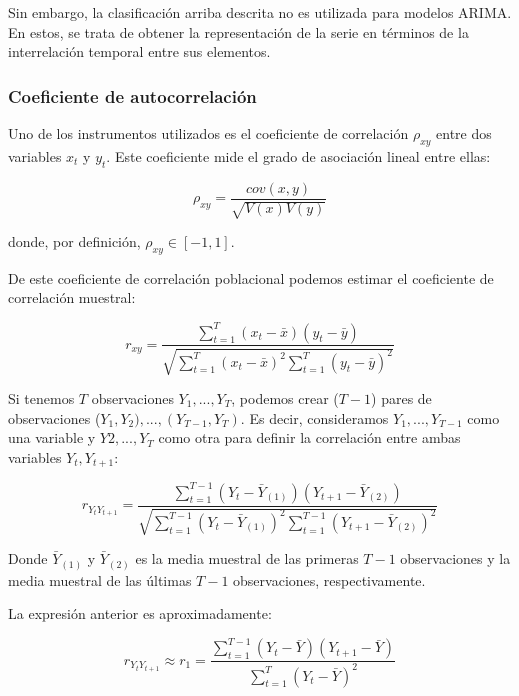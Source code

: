\documentclass[a4paper,10pt]{article}
\begin{document}
Sin embargo, la clasificación arriba descrita no es utilizada para modelos ARIMA. En estos, se trata de obtener la representación de la serie en términos de la interrelación temporal entre sus elementos.

\subsubsection{Coeficiente de autocorrelación}

Uno de los instrumentos utilizados es el coeficiente de correlación $\rho_{xy}$ entre dos variables $x_t$ y $y_t$. Este coeficiente mide el grado de asociación lineal entre ellas:

\begin{equation}
 \rho_{xy} = \frac{cov(x,y)}{\sqrt{V(x)V(y)}}
\end{equation}

donde, por definición, $\rho_{xy} \in [-1,1]$.

De este coeficiente de correlación poblacional podemos estimar el coeficiente de correlación muestral:

\begin{equation}
 r_{xy} = \frac{\sum_{t=1}^{T} (x_t - \bar{x}) (y_t - \bar{y})}
 {\sqrt{\sum_{t=1}^{T} (x_t - \bar{x})^2 \sum_{t=1}^{T} (y_t - \bar{y})^2 } }
\end{equation}

Si tenemos $T$ observaciones $Y_1,..., Y_T$, podemos crear ($T-1$) pares de observaciones ($Y_1,Y_2),...,(Y_{T-1},Y_T)$. Es decir, consideramos $Y_1,...,Y_{T-1}$ como una variable y $Y2,...,Y_T$ como otra para definir la correlación entre ambas variables $Y_t,Y_{t+1}$:

\begin{equation}
 r_{Y_t Y_{t+1}} = \frac{\sum_{t=1}^{T-1} (Y_t - \bar{Y}_{(1)}) (Y_{t+1} - \bar{Y}_{(2)})}
 {\sqrt{\sum_{t=1}^{T-1} (Y_t - \bar{Y}_{(1)})^2 \sum_{t=1}^{T-1} (Y_{t+1} - \bar{Y}_{(2)})^2 } }
\end{equation}

Donde $\bar{Y}_{(1)}$ y $\bar{Y}_{(2)}$ es la media muestral de las primeras $T-1$ observaciones y la media muestral de las últimas $T-1$ observaciones, respectivamente.

La expresión anterior es aproximadamente:

\begin{equation}
 r_{Y_t Y_{t+1}} \approx r_1 = \frac{\sum_{t=1}^{T-1} (Y_t - \bar{Y}) (Y_{t+1} - \bar{Y})}
 {\sum_{t=1}^{T} (Y_t - \bar{Y})^2 }
\end{equation}
\end{document}
